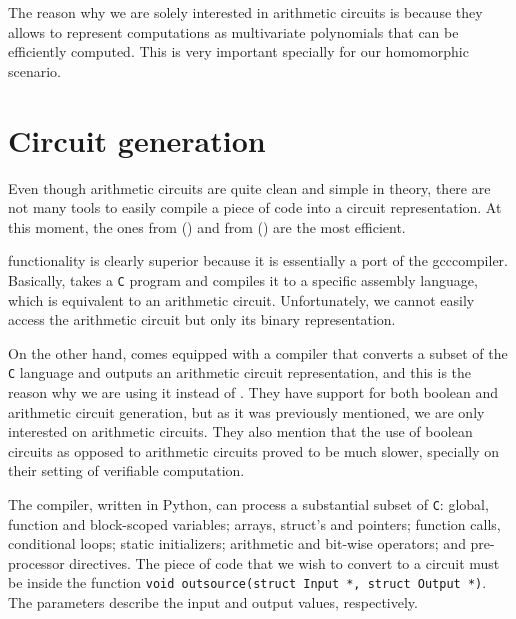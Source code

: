 The reason why we are solely interested in arithmetic circuits is because they
allows to represent computations as multivariate polynomials that can be
efficiently computed. This is very important specially for our homomorphic
scenario.

\section{Circuit generation}
Even though arithmetic circuits are quite clean and simple in theory, there are
not many tools to easily compile a piece of code into a circuit representation.
At this moment, the ones from \textcite{parno:howell:gentry:raykova:2013}
() and from \textcite{tinyram}
() are the most efficient.

\textcite{tinyram} functionality is clearly superior because it is essentially
a port of the gcc\footnotemark compiler. Basically,  takes
a \texttt{C} program and compiles it to a specific  assembly
language, which is equivalent to an arithmetic circuit. Unfortunately, we
cannot easily access the arithmetic circuit but only its binary representation.


On the other hand,  comes equipped
with a compiler that converts a subset of the \texttt{C} language and outputs
an arithmetic circuit representation, and this is the reason why we are using
it instead of .
They have support for both boolean and arithmetic circuit generation, but as it
was previously mentioned, we are only interested on arithmetic circuits. They
also mention that the use of boolean circuits as opposed to arithmetic circuits
proved to be much slower, specially on their setting of verifiable computation.

The compiler, written in Python, can process a substantial subset of
\texttt{C}: global, function and block-scoped variables; arrays, struct's and
pointers; function calls, conditional loops; static initializers; arithmetic
and bit-wise operators; and pre-processor directives. The piece of code that we
wish to convert to a circuit must be inside the function \texttt{void
outsource(struct Input *, struct Output *)}. The parameters describe the input
and output values, respectively.

